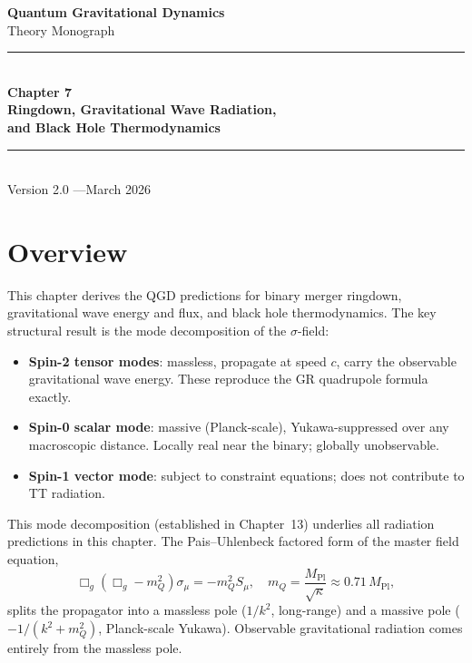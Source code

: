 \documentclass[12pt,a4paper]{article}
\newcommand{\mQ}{m_Q}
\begin{document}
\begin{titlepage}
  \centering
  \vspace*{2.5cm}
  {\LARGE\bfseries Quantum Gravitational Dynamics\\[0.5em]}
  {\large Theory Monograph\\[2.5cm]}
  \rule{\textwidth}{1pt}\\[0.6em]
  {\Huge\bfseries Chapter 7}\\[0.5em]
  {\Large\bfseries Ringdown, Gravitational Wave Radiation,\\[0.25em]
   and Black Hole Thermodynamics}\\[0.6em]
  \rule{\textwidth}{1pt}\\[3cm]
  {\normalsize Version 2.0 \quad---\quad March 2026}
  \vfill
\end{titlepage}

\tableofcontents
\newpage

\section{Overview}

This chapter derives the QGD predictions for binary merger ringdown, gravitational
wave energy and flux, and black hole thermodynamics. The key structural result is the
mode decomposition of the $\sigma$-field:

\begin{itemize}[noitemsep]
  \item \textbf{Spin-2 tensor modes}: massless, propagate at speed $c$, carry the
    observable gravitational wave energy. These reproduce the GR quadrupole formula
    exactly.
  \item \textbf{Spin-0 scalar mode}: massive (Planck-scale), Yukawa-suppressed over
    any macroscopic distance. Locally real near the binary; globally unobservable.
  \item \textbf{Spin-1 vector mode}: subject to constraint equations; does not contribute
    to TT radiation.
\end{itemize}

This mode decomposition (established in Chapter~13) underlies all radiation predictions
in this chapter. The Pais--Uhlenbeck factored form of the master field equation,
\begin{equation}
  \Box_g(\Box_g - \mQ^2)\sigma_\mu = -\mQ^2 S_\mu,
  \quad \mQ = \frac{M_\mathrm{Pl}}{\sqrt\kappa} \approx 0.71\,M_\mathrm{Pl},
\end{equation}
splits the propagator into a massless pole ($1/k^2$, long-range) and a massive pole
($-1/(k^2 + \mQ^2)$, Planck-scale Yukawa). Observable gravitational radiation comes
entirely from the massless pole.
\end{document}
